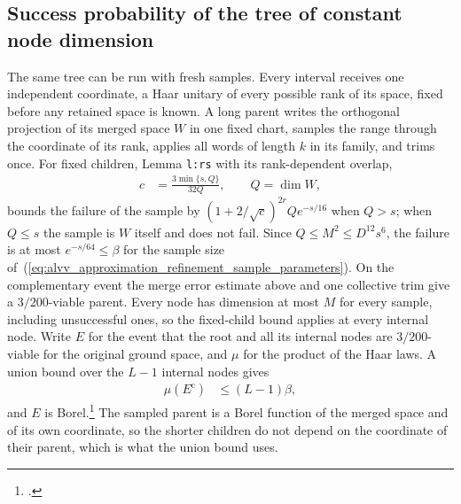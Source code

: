 \documentclass{article}
\begin{document}
\subsection*{Success probability of the tree of constant node dimension}
The same tree can be run with fresh samples. Every interval receives one
independent coordinate, a Haar unitary of every possible rank of its space,
fixed before any retained space is known. A long parent writes the
orthogonal projection of its merged space $W$ in one fixed chart, samples
the range through the coordinate of its rank, applies all words of length
$k$ in its family, and trims once. For fixed children, Lemma
\texttt{l:rs} with its rank-dependent overlap,
\begin{align}
    c&=\frac{3\min\{s,Q\}}{32Q},\qquad Q=\dim W,
    \label{eq:alvv16_approximation_parameters_canonical_overlap}
\end{align}
bounds the failure of the sample by $(1+2/\sqrt c)^{2r}Qe^{-s/16}$ when
$Q>s$; when $Q\le s$ the sample is $W$ itself and does not fail. Since
$Q\le M^2\le D^{12}s^6$, the failure is at most $e^{-s/64}\le\beta$ for the
sample size of~(\ref{eq:alvv_approximation_refinement_sample_parameters}).
On the complementary event the merge error estimate above and one
collective trim give a $3/200$-viable parent. Every node has dimension at
most $M$ for every sample, including unsuccessful ones, so the fixed-child
bound applies at every internal node. Write $E$ for the event that the
root and all its internal nodes are $3/200$-viable for the original ground
space, and $\mu$ for the product of the Haar laws. A union bound over the
$L-1$ internal nodes gives
\begin{align}
    \mu(E^{\mathrm c})&\le(L-1)\beta,
    \label{eq:alvv16_approximation_parameters_tree_failure}
\end{align}
and $E$ is Borel.\footnote{.}
The sampled parent is a Borel function of the merged space and of its own
coordinate, so the shorter children do not depend on the coordinate of
their parent, which is what the union bound uses.
\end{document}
